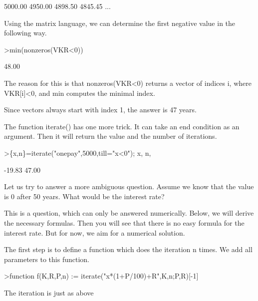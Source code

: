 \documentclass{article}
\begin{document}
\begin{eulernotebook}
\begin{eulercomment}
\begin{eulercomment}
\begin{eulercomment}
\begin{eulercomment}
\begin{eulercomment}
\begin{eulercomment}
\begin{eulercomment}
\begin{eulercomment}
\begin{eulercomment}
\begin{eulercomment}
\begin{euleroutput}
      5000.00     4950.00     4898.50     4845.45     ...
\end{euleroutput}
\begin{eulercomment}
Using the matrix language, we can determine the first negative value in the
following way.
\end{eulercomment}
\begin{eulerprompt}
>min(nonzeros(VKR<0))
\end{eulerprompt}
\begin{euleroutput}
        48.00 
\end{euleroutput}
\begin{eulercomment}
The reason for this is that nonzeros(VKR\textless{}0) returns a vector of indices i,
where VKR[i]\textless{}0, and min computes the minimal index.

Since vectors always start with index 1, the answer is 47 years.

The function iterate() has one more trick. It can take an end condition as an
argument. Then it will return the value and the number of iterations.
\end{eulercomment}
\begin{eulerprompt}
>\{x,n\}=iterate("onepay",5000,till="x<0"); x, n,
\end{eulerprompt}
\begin{euleroutput}
       -19.83 
        47.00 
\end{euleroutput}
\begin{eulercomment}
Let us try to answer a more ambiguous question. Assume we know that the value
is 0 after 50 years. What would be the interest rate?

This is a question, which can only be answered numerically. Below, we will
derive the necessary formulas. Then you will see that there is no easy
formula for the interest rate. But for now, we aim for a numerical solution.

The first step is to define a function which does the iteration n times. We
add all parameters to this function.
\end{eulercomment}
\begin{eulerprompt}
>function f(K,R,P,n) := iterate("x*(1+P/100)+R",K,n;P,R)[-1]
\end{eulerprompt}
\begin{eulercomment}
The iteration is just as above


\end{eulercomment}
\end{eulercomment}
\end{eulercomment}
\end{eulercomment}
\end{eulercomment}
\end{eulercomment}
\end{eulercomment}
\end{eulercomment}
\end{eulercomment}
\end{eulercomment}
\end{eulercomment}
\end{eulernotebook}
\end{document}
